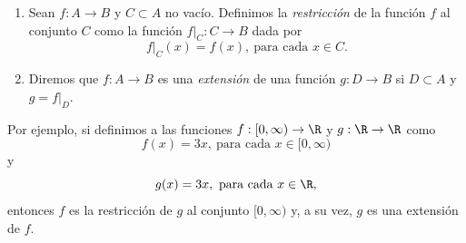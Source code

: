 \documentclass[12pt,a4paper]{book}
\begin{document}
    \begin{definicion}\label{def:18}
        \leavevmode
        \begin{enumerate}
            \item Sean $f:A\to B$ y $C\subset A$ no vacío. Definimos la \textit{restricción} de la función
            $f$ al conjunto $C$ como la función $f|_{C}:C\to B$ dada por
            \begin{equation*}
                f|_{C}(x)=f(x),\ \text{para cada }x\in C.
            \end{equation*}
            \item Diremos que $f:A\to B$ es una \textit{extensión} de una función $g:D\to B$ si
            $D\subset A$ y $g=f|_{D}$.
        \end{enumerate}
    \end{definicion}

    Por ejemplo, si definimos a las funciones $f:[0,\infty)\to\R$ y $g:\R\to\R$ como
    \begin{equation*}
        f(x)=3x,\ \text{para cada }x\in[0,\infty)
    \end{equation*}
    y
    \begin{equation*}
        g(x)=3x,\ \text{para cada }x\in\R,
    \end{equation*}
    entonces $f$ es la restricción de $g$ al conjunto $[0,\infty)$ y, a su vez, $g$ es una
    extensión de $f$.
\end{document}
